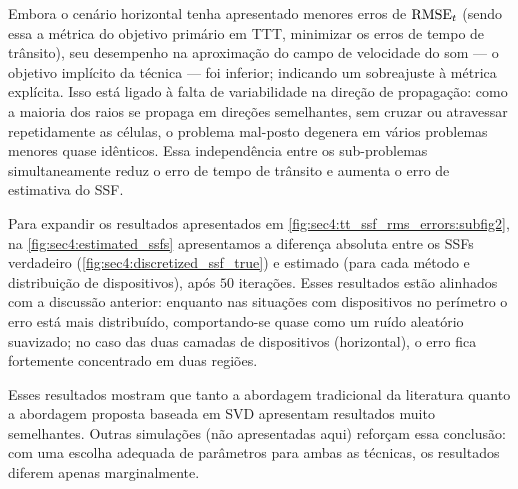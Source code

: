 Embora o cenário horizontal tenha apresentado menores erros de $\operatorname{RMSE}_{t}$ (sendo essa a métrica do objetivo primário em TTT, minimizar os erros de tempo de trânsito), seu desempenho na aproximação do campo de velocidade do som --- o objetivo implícito da técnica --- foi inferior; indicando um sobreajuste à métrica explícita. Isso está ligado à falta de variabilidade na direção de propagação: como a maioria dos raios se propaga em direções semelhantes, sem cruzar ou atravessar repetidamente as células, o problema mal-posto degenera em vários problemas menores quase idênticos. Essa independência entre os sub-problemas simultaneamente reduz o erro de tempo de trânsito e aumenta o erro de estimativa do SSF.

Para expandir os resultados apresentados em \cref{fig:sec4:tt_ssf_rms_errors:subfig2}, na \cref{fig:sec4:estimated_ssfs} apresentamos a diferença absoluta entre os SSFs verdadeiro (\cref{fig:sec4:discretized_ssf_true}) e estimado (para cada método e distribuição de dispositivos), após $50$ iterações. Esses resultados estão alinhados com a discussão anterior: enquanto nas situações com dispositivos no perímetro o erro está mais distribuído, comportando-se quase como um ruído aleatório suavizado; no caso das duas camadas de dispositivos (horizontal), o erro fica fortemente concentrado em duas regiões.

Esses resultados mostram que tanto a abordagem tradicional da literatura quanto a abordagem proposta baseada em SVD apresentam resultados muito semelhantes. Outras simulações (não apresentadas aqui) reforçam essa conclusão: com uma escolha adequada de parâmetros para ambas as técnicas, os resultados diferem apenas marginalmente.

